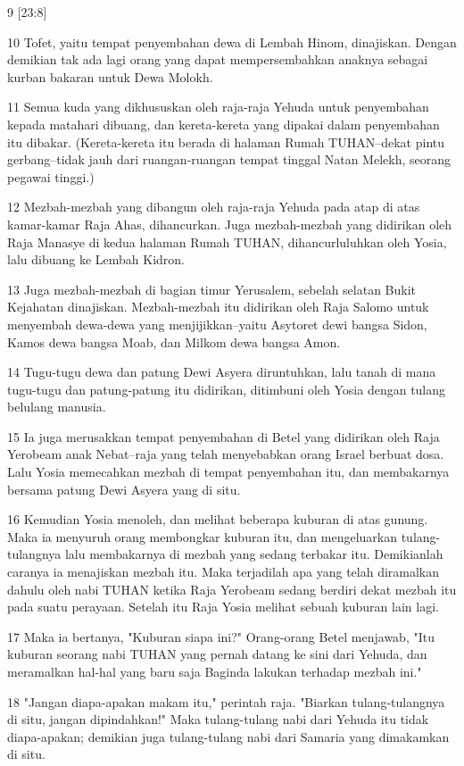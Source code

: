 \par 9 [23:8]
\par 10 Tofet, yaitu tempat penyembahan dewa di Lembah Hinom, dinajiskan. Dengan demikian tak ada lagi orang yang dapat mempersembahkan anaknya sebagai kurban bakaran untuk Dewa Molokh.
\par 11 Semua kuda yang dikhususkan oleh raja-raja Yehuda untuk penyembahan kepada matahari dibuang, dan kereta-kereta yang dipakai dalam penyembahan itu dibakar. (Kereta-kereta itu berada di halaman Rumah TUHAN--dekat pintu gerbang--tidak jauh dari ruangan-ruangan tempat tinggal Natan Melekh, seorang pegawai tinggi.)
\par 12 Mezbah-mezbah yang dibangun oleh raja-raja Yehuda pada atap di atas kamar-kamar Raja Ahas, dihancurkan. Juga mezbah-mezbah yang didirikan oleh Raja Manasye di kedua halaman Rumah TUHAN, dihancurluluhkan oleh Yosia, lalu dibuang ke Lembah Kidron.
\par 13 Juga mezbah-mezbah di bagian timur Yerusalem, sebelah selatan Bukit Kejahatan dinajiskan. Mezbah-mezbah itu didirikan oleh Raja Salomo untuk menyembah dewa-dewa yang menjijikkan--yaitu Asytoret dewi bangsa Sidon, Kamos dewa bangsa Moab, dan Milkom dewa bangsa Amon.
\par 14 Tugu-tugu dewa dan patung Dewi Asyera diruntuhkan, lalu tanah di mana tugu-tugu dan patung-patung itu didirikan, ditimbuni oleh Yosia dengan tulang belulang manusia.
\par 15 Ia juga merusakkan tempat penyembahan di Betel yang didirikan oleh Raja Yerobeam anak Nebat--raja yang telah menyebabkan orang Israel berbuat dosa. Lalu Yosia memecahkan mezbah di tempat penyembahan itu, dan membakarnya bersama patung Dewi Asyera yang di situ.
\par 16 Kemudian Yosia menoleh, dan melihat beberapa kuburan di atas gunung. Maka ia menyuruh orang membongkar kuburan itu, dan mengeluarkan tulang-tulangnya lalu membakarnya di mezbah yang sedang terbakar itu. Demikianlah caranya ia menajiskan mezbah itu. Maka terjadilah apa yang telah diramalkan dahulu oleh nabi TUHAN ketika Raja Yerobeam sedang berdiri dekat mezbah itu pada suatu perayaan. Setelah itu Raja Yosia melihat sebuah kuburan lain lagi.
\par 17 Maka ia bertanya, "Kuburan siapa ini?" Orang-orang Betel menjawab, "Itu kuburan seorang nabi TUHAN yang pernah datang ke sini dari Yehuda, dan meramalkan hal-hal yang baru saja Baginda lakukan terhadap mezbah ini."
\par 18 "Jangan diapa-apakan makam itu," perintah raja. "Biarkan tulang-tulangnya di situ, jangan dipindahkan!" Maka tulang-tulang nabi dari Yehuda itu tidak diapa-apakan; demikian juga tulang-tulang nabi dari Samaria yang dimakamkan di situ.
